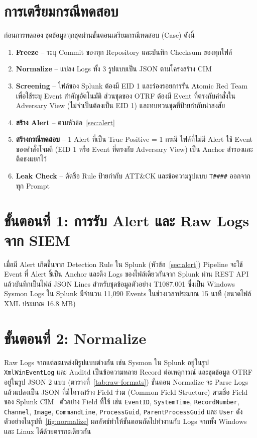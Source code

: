 \section{การเตรียมกรณีทดสอบ}
\label{sec:case-prep}

ก่อนการทดลอง ชุดข้อมูลทุกชุดผ่านขั้นตอนเตรียมกรณีทดสอบ (Case) ดังนี้
\begin{enumerate}
  \item \textbf{Freeze} -- ระบุ Commit ของทุก Repository และบันทึก Checksum ของทุกไฟล์
  \item \textbf{Normalize} -- แปลง Logs ทั้ง 3 รูปแบบเป็น JSON ตามโครงสร้าง CIM
  \item \textbf{Screening} -- ไฟล์ของ Splunk ต้องมี EID 1 และร่องรอยการรัน Atomic Red Team เพื่อใช้ระบุ Event สำคัญอัตโนมัติ
        ส่วนชุดของ OTRF ต้องมี Event ที่ตรงกับคำสั่งใน Adversary View (ไม่จำเป็นต้องเป็น EID 1)
        และทบทวนชุดที่ป้ายกำกับน่าสงสัย
  \item \textbf{สร้าง Alert} -- ตามหัวข้อ~\ref{sec:alert}
  \item \textbf{สร้างกรณีทดสอบ} -- 1 Alert ที่เป็น True Positive = 1 กรณี
        ไฟล์ที่ไม่มี Alert ใช้ Event ของคำสั่งโจมตี (EID 1 หรือ Event ที่ตรงกับ Adversary View) เป็น Anchor สำรองและติดธงแยกไว้
  \item \textbf{Leak Check} -- ตัดชื่อ Rule ป้ายกำกับ ATT\&CK และข้อความรูปแบบ \texttt{T\#\#\#\#} ออกจากทุก Prompt
\end{enumerate}

\section{ขั้นตอนที่ 1: การรับ Alert และ Raw Logs จาก SIEM}

เมื่อมี Alert เกิดขึ้นจาก Detection Rule ใน Splunk (หัวข้อ~\ref{sec:alert})
Pipeline จะใช้ Event ที่ Alert ชี้เป็น Anchor และดึง Logs ของไฟล์เดียวกันจาก Splunk ผ่าน REST API
แล้วบันทึกเป็นไฟล์ JSON Lines
สำหรับชุดข้อมูลตัวอย่าง T1087.001 ซึ่งเป็น Windows Sysmon Logs ใน Splunk
มีจำนวน 11,090 Events ในช่วงเวลาประมาณ 15 นาที (ขนาดไฟล์ XML ประมาณ 16.8 MB)

\section{ขั้นตอนที่ 2: Normalize}

Raw Logs จากแต่ละแหล่งมีรูปแบบต่างกัน เช่น Sysmon ใน Splunk อยู่ในรูป \texttt{XmlWinEventLog}
และ Auditd เป็นข้อความหลาย Record ต่อเหตุการณ์
และชุดข้อมูล OTRF อยู่ในรูป JSON 2 แบบ (ตารางที่~\ref{tab:raw-formats})
ขั้นตอน Normalize จะ Parse Logs แล้วแปลงเป็น JSON ที่มีโครงสร้าง Field ร่วม (Common Field Structure)
ตามชื่อ Field ของ Splunk CIM~\cite{splunk-cim} ตัวอย่าง Field ที่ใช้ เช่น \texttt{EventID}, \texttt{SystemTime}, \texttt{RecordNumber},
\texttt{Channel}, \texttt{Image}, \texttt{CommandLine}, \texttt{ProcessGuid}, \texttt{ParentProcessGuid} และ \texttt{User}
ดังตัวอย่างในรูปที่~\ref{fig:normalize}
ผลลัพธ์ทำให้ขั้นตอนถัดไปทำงานกับ Logs จากทั้ง Windows และ Linux ได้ด้วยตรรกะเดียวกัน

